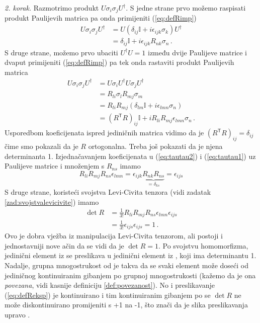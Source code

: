 \emph{2. korak.} 
Razmotrimo produkt \( U \sigma_i \sigma_j U^\dagger \).  S jedne strane prvo
možemo raspisati produkt Paulijevih matrica pa onda primijeniti (\ref{eq:defRimp}) 
\begin{align}
    U \sigma_i \sigma_j U^\dagger& =  U \left(
        \delta_{ij} \mathbb{I} + i \epsilon_{ijk}\sigma_{k} \right) U^\dagger \\
                                 & = \delta_{ij} \mathbb{I} + i \epsilon_{ijk}
                                 R_{nk} \sigma_n \,.
                                 \label{eq:tautau1}
\end{align}
S druge strane, možemo prvo ubaciti $U^\dagger U = 1$ između dvije Paulijeve
matrice i dvaput primijeniti (\ref{eq:defRimp}) pa tek onda rastaviti produkt
Paulijevih matrica
\begin{align}
    U \sigma_i \sigma_j U^\dagger& =  U \sigma_i U^\dagger U \sigma_j U^\dagger \\
                                 & = R_{li} \sigma_{l} R_{mj} \sigma_{m} \\
                                 & = R_{li} R_{mj} \left(
        \delta_{lm} \mathbb{I} + i \epsilon_{lmn}\sigma_{n} \right) \\
                                 & = (R^{\mathsf{T}} R)_{ij} \mathbb{I}
                     + i R_{li} R_{mj}\epsilon_{lmn}\sigma_{n} \,.
                                 \label{eq:tautau2}
\end{align}
Usporedbom koeficijenata ispred jediničnih matrica vidimo da je
$(R^{\mathsf{T}} R)_{ij} = \delta_{ij}$ čime smo pokazali da je $R$ ortogonalna.
Treba još pokazati da je njena determinanta 1. Izjednačavanjem
koeficijenata u (\ref{eq:tautau2})  i (\ref{eq:tautau1}) uz Paulijeve matrice
i množenjem s $R_{ns}$ imamo
\begin{equation}
    R_{li} R_{mj}R_{ns}\epsilon_{lmn} = \epsilon_{ijk} \underbrace{R_{nk} R_{ns}}_{=\delta_{ks}}
    = \epsilon_{ijs}
\end{equation}
S druge strane, koristeći svojstva Levi-Civita tenzora (vidi zadatak \ref{zad:svojstvalevicivite})
imamo
\begin{align}
 \det R& = \frac{1}{3!} R_{li} R_{mj}R_{ns} \epsilon_{lmn} \epsilon_{ijs}  \\
       & = \frac{1}{3!} \epsilon_{ijs}\epsilon_{ijs} = 1\,.
\end{align}
Ovo je dobra vježba iz manipulacija Levi-Civita tenzorom, ali postoji i jednostavniji
nove ačin da se vidi da je $\det R = 1$. 
Po svojstvu homomorfizma, jedinični element iz  se preslikava u jedinični
element iz , koji ima determinantu 1.
Nadalje, grupna mnogostrukost od  je takva da se
svaki element može doseći od jediničnog kontinuiranim gibanjem po grupnoj mnogostrukosti
(kažemo da je ona \emph{povezana}, vidi kasnije definiciju \ref{def:povezanost}).
 
No i preslikavanje (\ref{eq:defReksp}) je kontinuirano i tim kontinuiranim gibanjem
po  se $\det R$ ne može diskontinuirano promijeniti s +1 na -1, što znači da je slika
preslikavanja upravo .

